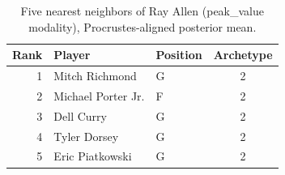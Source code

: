 \begin{table}[htbp]
  \centering\small
  \begin{tabular}{rllc}
    \toprule
    Rank & Player & Position & Archetype \\
    \midrule
    1 & Mitch Richmond & G & 2 \\
    2 & Michael Porter Jr. & F & 2 \\
    3 & Dell Curry & G & 2 \\
    4 & Tyler Dorsey & G & 2 \\
    5 & Eric Piatkowski & G & 2 \\
    \bottomrule
  \end{tabular}
  \caption{Five nearest neighbors of Ray Allen (peak_value modality), Procrustes-aligned posterior mean.}
  \label{tab:Ray_Allen_neighbors_peak_value}
\end{table}

